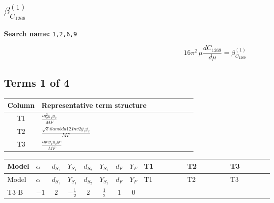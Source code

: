 \documentclass[8pt]{article}
\begin{document}
\begin{landscape}
\section*{$\beta_{C_{1269}}^{(1)}$}
\noindent\textbf{Search name: }\texttt{1,2,6,9}\par\smallskip
\[16\pi^2\,\mu\frac{d C_{1269}}{d\mu}=\beta_{C_{1269}}^{(1)}\]
\subsection*{Terms 1 of 4}
\begin{center}
\begin{tabular}{@{}c >{\raggedright\arraybackslash}p{0.82\linewidth}@{}}
\toprule
Column & Representative term structure \\
\midrule
T1 & \(\displaystyle \frac{i g_{2}^{2} \overline{y_{1}} \overline{y_{2}}}{MF}\) \\
\midrule
T2 & \(\displaystyle \frac{\sqrt{3} i lambda12Inv2 \overline{y_{1}} \overline{y_{2}}}{MF}\) \\
\midrule
T3 & \(\displaystyle \frac{i ye \overline{y_{1}} \overline{y_{2}} \overline{ye}}{MF}\) \\
\midrule
\bottomrule
\end{tabular}
\end{center}
\smallskip
\tiny
\begin{longtable}{@{}llcccccc >{\raggedright\arraybackslash}p{0.21\linewidth} >{\raggedright\arraybackslash}p{0.21\linewidth} >{\raggedright\arraybackslash}p{0.21\linewidth}@{}}
\toprule
Model & $\alpha$ & $d_{S_1}$ & $Y_{S_1}$ & $d_{S_2}$ & $Y_{S_2}$ & $d_F$ & $Y_F$ & T1 & T2 & T3 \\
\midrule
\endfirsthead
\toprule
Model & $\alpha$ & $d_{S_1}$ & $Y_{S_1}$ & $d_{S_2}$ & $Y_{S_2}$ & $d_F$ & $Y_F$ & T1 & T2 & T3 \\
\midrule
\endhead
T3-B & $-1$ & $2$ & $-\frac{1}{2}$ & $2$ & $\frac{1}{2}$ & $1$ & $0$ & \scriptsize\adjustbox{max width=\linewidth}{$\begin{gathered} - \frac{3 i g_{2}^{2} \overline{y_{1}} \overline{y_{2}}}{8 MF}\end{gathered}$} & \scriptsize\adjustbox{max width=\linewidth}{$\begin{gathered} - \frac{\sqrt{3} i lambda12Inv2 \overline{y_{1}} \overline{y_{2}}}{6 MF}\end{gathered}$} & \scriptsize\adjustbox{max width=\linewidth}{$\begin{gathered} \frac{i ye \overline{y_{1}} \overline{y_{2}} \overline{ye}}{8 MF}\end{gathered}$} \\

\end{longtable}
\end{landscape}
\end{document}
